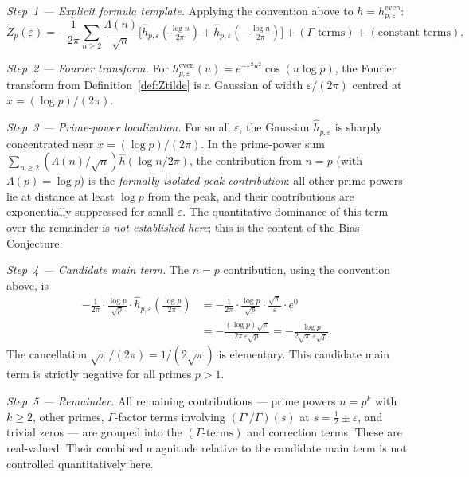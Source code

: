 \documentclass[11pt]{article}
\newcommand{\Zt}{\widetilde{Z}}
\begin{document}
\textit{Step~1 --- Explicit formula template.}
Applying the convention above to $h=h^{\mathrm{even}}_{p,\varepsilon}$:
\[
\Zt_p(\varepsilon)
  = -\frac{1}{2\pi}\sum_{n\geq 2}\frac{\Lambda(n)}{\sqrt{n}}
    \bigl[\hat{h}_{p,\varepsilon}({\textstyle\tfrac{\log n}{2\pi}})
    + \hat{h}_{p,\varepsilon}({-\textstyle\tfrac{\log n}{2\pi}})\bigr]
  + (\Gamma\text{-terms}) + (\text{constant terms}).
\]

\textit{Step~2 --- Fourier transform.}
For $h^{\mathrm{even}}_{p,\varepsilon}(u)=e^{-\varepsilon^2 u^2}\cos(u\log p)$,
the Fourier transform from Definition~\ref{def:Ztilde} is
a Gaussian of width $\varepsilon/(2\pi)$ centred at $x=(\log p)/(2\pi)$.

\textit{Step~3 --- Prime-power localization.}
For small $\varepsilon$, the Gaussian $\hat{h}_{p,\varepsilon}$ is
sharply concentrated near $x=(\log p)/(2\pi)$.
In the prime-power sum $\sum_{n\geq 2}(\Lambda(n)/\sqrt{n})\hat{h}(\log n/2\pi)$,
the contribution from $n=p$ (with $\Lambda(p)=\log p$) is the
\textit{formally isolated peak contribution}: all other prime powers lie
at distance at least $\log p$ from the peak, and their contributions
are exponentially suppressed for small $\varepsilon$.
The quantitative dominance of this term over the remainder is
\textit{not established here}; this is the content of the
Bias Conjecture.

\textit{Step~4 --- Candidate main term.}
The $n=p$ contribution, using the convention above, is
\begin{align*}
-\frac{1}{2\pi}\cdot\frac{\log p}{\sqrt{p}}\cdot\hat{h}_{p,\varepsilon}
  \!\left(\tfrac{\log p}{2\pi}\right)
&= -\frac{1}{2\pi}\cdot\frac{\log p}{\sqrt{p}}\cdot\frac{\sqrt{\pi}}{\varepsilon}
   \cdot e^0 \\
&= -\frac{(\log p)\sqrt{\pi}}{2\pi\,\varepsilon\sqrt{p}}
 = -\frac{\log p}{2\sqrt{\pi}\,\varepsilon\sqrt{p}}.
\end{align*}
The cancellation $\sqrt{\pi}/(2\pi)=1/(2\sqrt{\pi})$ is elementary.
This candidate main term is strictly negative for all primes $p>1$.

\textit{Step~5 --- Remainder.}
All remaining contributions --- prime powers $n=p^k$ with $k\geq 2$,
other primes, $\Gamma$-factor terms involving $(\Gamma'/\Gamma)(s)$
at $s=\tfrac{1}{2}\pm\varepsilon$, and trivial zeros --- are grouped into
the $(\Gamma\text{-terms})$ and correction terms.
These are real-valued.
Their combined magnitude relative to the candidate main term
is not controlled quantitatively here.
\end{document}
